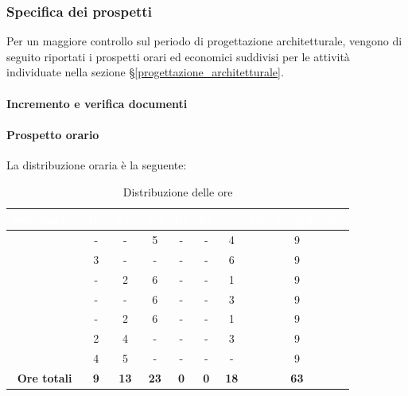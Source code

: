 \subsubsection{Specifica dei prospetti}
Per un maggiore controllo sul periodo di progettazione architetturale, vengono di seguito riportati i prospetti orari ed economici suddivisi per le attività individuate nella sezione \S\ref{progettazione_architetturale}.
\paragraph{Incremento e verifica documenti}
\paragraph*{Prospetto orario}
La distribuzione oraria è la seguente:
\begin{table}[H]
	\begin{center}
		\begin{tabular}{ |c c c c c c c c| }
			\rowcolor{darkblue} 
			\textcolor{white}{\textbf{Nominativo}} & \textcolor{white}{\textbf{Re}} & \textcolor{white}{\textbf{Am}} & \textcolor{white}{\textbf{An}} & \textcolor{white}{\textbf{Pt}} & \textcolor{white}{\textbf{Pr}} & \textcolor{white}{\textbf{Ve}} & \textcolor{white}{\textbf{Ore Complessive}} \\ \hline
			\BL 	& -  	& -  	& 5 	& - 	& - 	& 4 	& 9 \\ \hline
			\FF 	& 3  	& -  	& - 	& - 	& - 	& 6  	& 9 \\ \hline
			\MM 	& -  	& 2  	& 6 	& -	& - 	& 1  	& 9 \\ \hline
			\PC 	& - 	& -  	& 6 	& - 	& - 	& 3 	& 9 \\ \hline
			\TG 	& -  	& 2 	& 6 	& - 	& - 	& 1 	& 9 \\ \hline
			\TL 	& 2  	& 4 	& - 	& - 	& - 	& 3 	& 9 \\ \hline
			\VD 	& 4  	& 5  	& - 	& - 	& - 	& -  	& 9 \\ \hline
			\textbf{Ore totali} & \textbf{9} & \textbf{13} & \textbf{23} & \textbf{0} & \textbf{0} & \textbf{18} & \textbf{63} \\ \hline
		\end{tabular}
		\caption{Distribuzione delle ore}
	\end{center}
\end{table}
